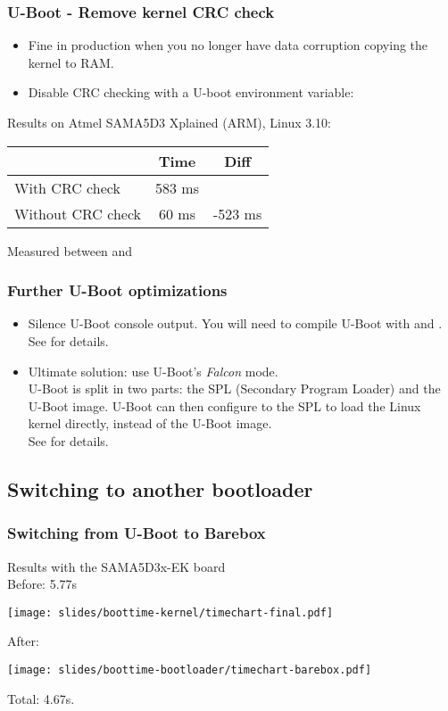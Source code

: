 \begin{frame}
\frametitle{U-Boot - Remove kernel CRC check}
\begin{itemize}
\item Fine in production when you no longer have data corruption
      copying the kernel to RAM.
\item Disable CRC checking with a U-boot environment variable:\\
\end{itemize}
Results on Atmel SAMA5D3 Xplained (ARM), Linux 3.10:
\newline\newline
\begin{tabular}{| l || c | c |}
\hline
& Time & Diff \\
\hline
With CRC check & 583 ms & \\
Without CRC check & 60 ms & -523 ms \\
\hline
\end{tabular}
\newline\newline
\small
Measured between  and 
\end{frame}

\begin{frame}
\frametitle{Further U-Boot optimizations}
\begin{itemize}
\item Silence U-Boot console output. You will need to compile
      U-Boot with  and
      .\\
      See  for details.
\item Ultimate solution: use U-Boot's {\em Falcon} mode.\\
      U-Boot is split in two parts: the SPL (Secondary Program Loader)
      and the U-Boot image. U-Boot can then configure to the SPL to load
      the Linux kernel directly, instead of the U-Boot image.\\
      See  for details.
\end{itemize}
\end{frame}

\subsection{Switching to another bootloader}

\begin{frame}
\frametitle{Switching from U-Boot to Barebox}
Results with the SAMA5D3x-EK board \\
Before: 5.77s
\begin{center}
    \texttt{[image: slides/boottime-kernel/timechart-final.pdf]}
\end{center}
After:
\begin{center}
    \texttt{[image: slides/boottime-bootloader/timechart-barebox.pdf]}
\end{center}
Total: 4.67s.
\end{frame}

